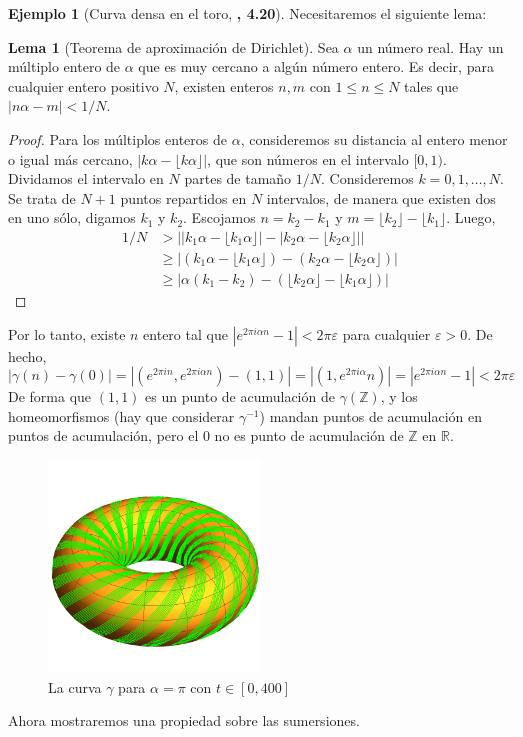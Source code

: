\documentclass[spanish]{book}
\theoremstyle{definition}
\newtheorem*{lema}{Lema}
\newtheorem*{ejem}{Ejemplo}
\newcommand{\R}{\mathbb{R}}
\newcommand{\Z}{\mathbb{Z}}
\begin{document}
\begin{ejem}[Curva densa en el toro, \cite{Lee} \textbf{, 4.20}]
		Necesitaremos el siguiente lema:
		\begin{lema}[Teorema de aproximación de Dirichlet]
			Sea $\alpha$ un número real. Hay un múltiplo entero de $\alpha$ que es muy cercano a algún número entero. Es decir, para cualquier entero positivo $N$, existen enteros $n,m$ con $1\leq n\leq N$ tales que ${|n\alpha-m|<1/N}$.
		\end{lema}
		\begin{proof}
			Para los múltiplos enteros de $\alpha$, consideremos su distancia al entero menor o igual más cercano, $|k\alpha-\lfloor k\alpha\rfloor|$, que son números en el intervalo $[0,1)$. Dividamos el intervalo en $N$ partes de tamaño $1/N$. Consideremos $k=0,1,\ldots,N$. Se trata de $N+1$ puntos repartidos en $N$ intervalos, de manera que existen dos en uno sólo, digamos $k_1$ y $k_2$. Escojamos $n=k_2-k_1$ y $m=\lfloor k_2\rfloor-\lfloor k_1\rfloor$. Luego,
			\begin{align*}
				1/N&>\Big||k_1\alpha-\lfloor k_1\alpha\rfloor|-|k_2\alpha-\lfloor k_2\alpha\rfloor|\Big|\\
				&\geq|(k_1\alpha-\lfloor k_1\alpha\rfloor)-(k_2\alpha-\lfloor k_2\alpha\rfloor)|\\
				&\geq|\alpha(k_1-k_2)-(\lfloor k_2\alpha\rfloor-\lfloor k_1\alpha\rfloor)|
			\end{align*}
		\end{proof}
		Por lo tanto, existe $n$ entero tal que $|e^{2\pi i\alpha n}-1|<2\pi\varepsilon$ para cualquier $\varepsilon>0.$ De hecho,
		\[|\gamma(n)-\gamma(0)|=|(e^{2\pi in},e^{2\pi i\alpha n})-(1,1)|=|(1,e^{2\pi i\alpha} n)|=|e^{2\pi i\alpha n}-1|<2\pi\varepsilon\]
		De forma que $(1,1)$ es un punto de acumulación de $\gamma(\Z)$, y los homeomorfismos (hay que considerar $\gamma^{-1}$) mandan puntos de acumulación en puntos de acumulación, pero el 0 no es punto de acumulación de $\Z$ en $\R$.
		\begin{figure}[H]
			\centering
			\includegraphics[width=0.5\textwidth]{fig9}
			\caption*{La curva $\gamma$ para $\alpha=\pi$ con $t\in[0,400]$}
		\end{figure}
	\end{ejem}
	Ahora mostraremos una propiedad sobre las sumersiones.
	
\end{document}
